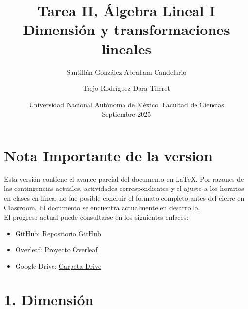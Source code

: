 \documentclass{article}
\title{Tarea II, Álgebra Lineal I\\[1ex] Dimensión y transformaciones lineales}
\author{
		Santillán González Abraham Candelario
		\and
		Trejo Rodríguez Dara Tiferet
	}
\date{Universidad Nacional Autónoma de México, Facultad de Ciencias\\[1ex] Septiembre 2025}
\begin{document}
		
		\maketitle
		\newpage
		
		\section*{Nota Importante de la version}
		
		Esta versión contiene el avance parcial del documento en LaTeX.
		Por razones de las contingencias actuales, actividades correspondientes
		y el ajuste a los horarios en clases en línea,
		no fue posible concluir el formato completo antes del cierre en Classroom.
		El documento se encuentra actualmente en desarrollo. \\ 
		
		El progreso actual puede consultarse en los siguientes enlaces:
		
		\begin{itemize}
			\item GitHub: \href{https://github.com/Cande-Tlanextli/Tarea-lineal-LaTeX.git}{Repositorio GitHub}
			\item Overleaf: \href{https://www.overleaf.com/read/xvcfwkqfjvgx#c1b3df}{Proyecto Overleaf}
			\item Google Drive: \href{https://drive.google.com/drive/folders/1riBnh370KrlFX1c7xBEoZJi1Zb3alMQC?usp=sharing}{Carpeta Drive}
		\end{itemize}
		
		
		
		
		\section*{1. Dimensión}
		
\end{document}
